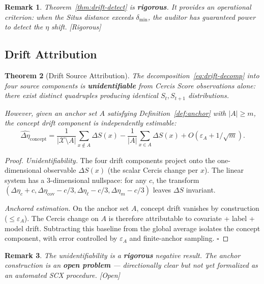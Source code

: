\documentclass[12pt,a4paper]{article}
\newtheorem{theorem}{Theorem}[section]
\newtheorem{remark}[theorem]{Remark}
\newcommand{\rigorous}{\textcolor{green!50!black}{\small\textsf{[Rigorous]}}}
\newcommand{\openquest}{\textcolor{red!70!black}{\small\textsf{[Open]}}}
\newcommand{\cX}{\mathcal{X}}
\begin{document}
\begin{remark}
Theorem~\ref{thm:drift-detect} is \textbf{rigorous}.  It provides an
operational criterion: when the Situs distance exceeds $\delta_{\min}$,
the auditor has guaranteed power to detect the $\eta$ shift.  \rigorous
\end{remark}

\subsection{Drift Attribution}

\begin{theorem}[Drift Source Attribution]
\label{thm:drift-attr}
The decomposition~\eqref{eq:drift-decomp} into four source components is
\textbf{unidentifiable} from Cercis Score observations alone: there exist
distinct quadruples producing identical $S_t, S_{t+1}$ distributions.

However, given an anchor set $A$ satisfying Definition~\ref{def:anchor}
with $|A| \geq m$, the concept drift component is independently estimable:
\begin{equation}\label{eq:concept-estimate}
    \widehat{\Delta\eta}_{\mathrm{concept}} =
    \frac{1}{|\cX \setminus A|}\sum_{x \notin A} \Delta S(x) -
    \frac{1}{|A|}\sum_{x \in A} \Delta S(x) +
    O(\varepsilon_A + 1/\sqrt{m}).
\end{equation}
\end{theorem}

\begin{proof}
\textit{Unidentifiability.}  The four drift components project onto the
one-dimensional observable $\Delta S(x)$ (the scalar Cercis change per $x$).
The linear system has a 3-dimensional nullspace: for any $c$, the transform
$(\Delta\eta_c + c, \Delta\eta_{\mathrm{cov}} - c/3,
\Delta\eta_\ell - c/3, \Delta\eta_m - c/3)$ leaves $\Delta S$ invariant.

\textit{Anchored estimation.}  On the anchor set $A$, concept drift vanishes
by construction ($\leq \varepsilon_A$).  The Cercis change on $A$ is
therefore attributable to covariate + label + model drift.  Subtracting this
baseline from the global average isolates the concept component, with error
controlled by $\varepsilon_A$ and finite-anchor sampling.  $\square$
\end{proof}

\begin{remark}
The unidentifiability is a \textbf{rigorous} negative result.  The anchor
construction is an \textbf{open problem} — directionally clear but not yet
formalized as an automated SCX procedure.  \openquest
\end{remark}
\end{document}
